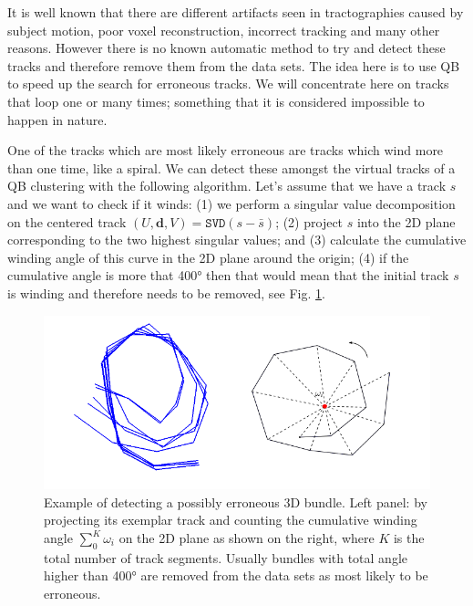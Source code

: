 \documentclass[preprint,authoryear,a4paper,10pt,onecolumn]{elsarticle}
\begin{document}
It is well known that there are different artifacts seen in
tractographies caused by subject motion, poor voxel reconstruction,
incorrect tracking and many other reasons. However there is no known
automatic method to try and detect these tracks and therefore remove
them from the data sets. The idea here is to use QB to speed up the
search for erroneous tracks. We will concentrate here on tracks that
loop one or many times; something that it is considered impossible to
happen in nature.

One of the tracks which are most likely erroneous are tracks which wind
more than one time, like a spiral. We can detect these amongst the
virtual tracks of a QB clustering with the following algorithm. Let's
assume that we have a track $s$ and we want to check if it winds: (1) we
perform a singular value decomposition on the centered track
$(U,\mathbf{d},V)=\mathtt{SVD}(s-\bar{s})$; (2) project $s$ into the 2D
plane corresponding to the two highest singular values; and (3)
calculate the cumulative winding angle of this curve in the 2D plane
around the origin; (4) if the cumulative angle is more that
\ang{400} then that would mean that the initial track $s$ is winding
and therefore needs to be removed, see Fig. \ref{Flo:winding}.

\begin{figure}
\begin{centering}
\includegraphics[scale=0.5]{last_figures/winding}
\par\end{centering}
\caption{Example of detecting a possibly erroneous 3D bundle. Left
  panel: by projecting its exemplar track and counting the cumulative
  winding angle $\sum_{0}^{K}\omega_{i}$ on the 2D plane as shown on the
  right, where $K$ is the total number of track segments. Usually
  bundles with total angle higher than \ang{400} are removed from the
  data sets as most likely to be erroneous.\label{Flo:winding}}
\end{figure}
\end{document}
